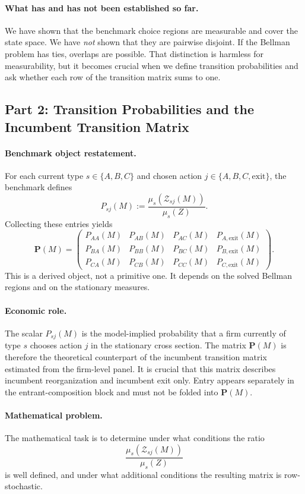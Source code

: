\paragraph{What has and has not been established so far.}
We have shown that the benchmark choice regions are measurable and cover the state space. We have \emph{not} shown that they are pairwise disjoint. If the Bellman problem has ties, overlaps are possible. That distinction is harmless for measurability, but it becomes crucial when we define transition probabilities and ask whether each row of the transition matrix sums to one.

\subsection{Part 2: Transition Probabilities and the Incumbent Transition Matrix}

\paragraph{Benchmark object restatement.}
For each current type $s\in\{A,B,C\}$ and chosen action $j\in\{A,B,C,\mathrm{exit}\}$, the benchmark defines
\[
P_{sj}(M):=\frac{\mu_s(\mathcal Z_{sj}(M))}{\mu_s(Z)}.
\]
Collecting these entries yields
\[
\mathbf P(M)=
\begin{pmatrix}
P_{AA}(M) & P_{AB}(M) & P_{AC}(M) & P_{A,\mathrm{exit}}(M) \\
P_{BA}(M) & P_{BB}(M) & P_{BC}(M) & P_{B,\mathrm{exit}}(M) \\
P_{CA}(M) & P_{CB}(M) & P_{CC}(M) & P_{C,\mathrm{exit}}(M)
\end{pmatrix}.
\]
This is a derived object, not a primitive one. It depends on the solved Bellman regions and on the stationary measures.

\paragraph{Economic role.}
The scalar $P_{sj}(M)$ is the model-implied probability that a firm currently of type $s$ chooses action $j$ in the stationary cross section. The matrix $\mathbf P(M)$ is therefore the theoretical counterpart of the incumbent transition matrix estimated from the firm-level panel. It is crucial that this matrix describes incumbent reorganization and incumbent exit only. Entry appears separately in the entrant-composition block and must not be folded into $\mathbf P(M)$.

\paragraph{Mathematical problem.}
The mathematical task is to determine under what conditions the ratio
\[
\frac{\mu_s(\mathcal Z_{sj}(M))}{\mu_s(Z)}
\]
is well defined, and under what additional conditions the resulting matrix is row-stochastic.

